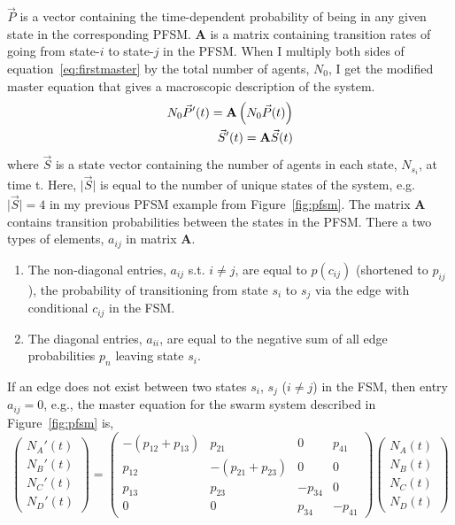 \documentclass[defaultstyle,12pt]{thesis}
\newcommand{\abs}[1]{\lvert#1\rvert}
\begin{document}
$\vec{P}$ is a vector containing the time-dependent probability of being in any given state in the corresponding PFSM. $\mathbf{A}$ is a matrix containing transition rates of going from state-$i$ to state-$j$ in the PFSM. When I multiply both sides of equation~\eqref{eq:firstmaster} by the total number of agents, $N_0$, I get the modified master equation that gives a macroscopic description of the system.
\begin{align}
N_0 \vec{P}'(t) = \mathbf{A}\left(N_0\vec{P}(t)\right)\notag\\
\vec{S}'(t) = \mathbf{A}\vec{S}(t)\label{eq:master}
\end{align}
where $\vec{S}$ is a state vector containing the number of agents in each state, $N_{s_i}$, at time t. Here, $\abs{\vec{S}}$ is equal to the number of unique states of the system, e.g. $\abs{\vec{S}} = 4$ in my previous PFSM example from Figure~\ref{fig:pfsm}. The matrix $\mathbf{A}$ contains transition probabilities between the states in the PFSM. There a two types of elements, $a_{ij}$ in matrix $\mathbf{A}$.
\begin{enumerate}
\item The non-diagonal entries, $a_{ij}$ s.t. $i\not=j$, are equal to $p(c_{ij})$ (shortened to $p_{ij}$), the probability of transitioning from state $s_i$ to $s_j$ via the edge with conditional $c_{ij}$ in the FSM.
\item The diagonal entries, $a_{ii}$, are equal to the negative sum of all edge probabilities $p_{n}$ leaving state $s_i$.
\end{enumerate} 
If an edge does not exist between two states $s_i$, $s_j$ ($i\not=j$) in the FSM, then entry $a_{ij} = 0$, e.g., the master equation for the swarm system described in Figure~\ref{fig:pfsm} is,
\begin{equation}\label{eq:mastereqns}
\left(
	\begin{array}{c}N_A'(t) \\ N_B'(t) \\ N_C'(t) \\ N_D'(t)\end{array}
\right) =
\left(
	\begin{array}{cccc}
	-(p_{12} + p_{13}) & p_{21} & 0 & p_{41}\\
	p_{12} & -(p_{21} + p_{23}) & 0 & 0\\
	p_{13} & p_{23} & -p_{34} & 0\\
	0 & 0 & p_{34} & -p_{41}
	\end{array}
\right)
\left(\begin{array}{c}N_A(t) \\ N_B(t) \\ N_C(t) \\ N_D(t)\end{array}\right)
\end{equation}
\end{document}

